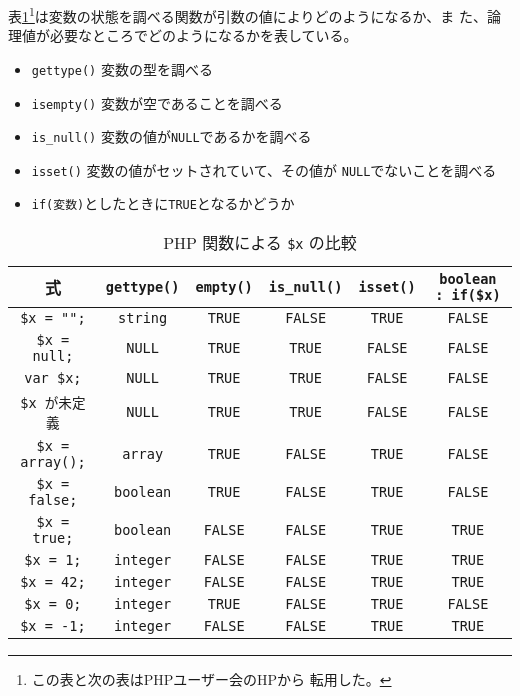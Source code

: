 表\ref{compareByFunction}\footnote{この表と次の表はPHPユーザー会のHPから
転用した。}は変数の状態を調べる関数が引数の値によりどのようになるか、ま
た、論理値が必要なところでどのようになるかを表している。
\begin{itemize}
 \item \texttt{gettype()} 変数の型を調べる
 \item \texttt{isempty()} 変数が空であることを調べる
 \item \texttt{is\_null()} 変数の値が\texttt{NULL}であるかを調べる
 \item \texttt{isset()} 変数の値がセットされていて、その値が
       \texttt{NULL}でないことを調べる
 \item \texttt{if(変数)}としたときに\texttt{TRUE}となるかどうか
\end{itemize}
\begin{table}[ht]
\caption{PHP 関数による \protect\texttt{\$x} の比較}\label{compareByFunction}
\begin{center}
  \begin{tabular}{|*{6}{c|}}\hline
式&\verb+gettype()+&\verb+empty()+&\verb+is_null()+&\verb+isset()+&\verb+boolean : if($x)+\\\hline
\verb+$x = "";+&\verb+string+&\verb+TRUE+&\verb+FALSE+&\verb+TRUE+&\verb+FALSE+\\\hline
\verb+$x = null;+&\verb+NULL+&\verb+TRUE+&\verb+TRUE+&\verb+FALSE+&\verb+FALSE+\\\hline
\verb+var $x;+&\verb+NULL+&\verb+TRUE+&\verb+TRUE+&\verb+FALSE+&\verb+FALSE+\\\hline
\verb+$x が未定義+&\verb+NULL+&\verb+TRUE+&\verb+TRUE+&\verb+FALSE+&\verb+FALSE+\\\hline
\verb+$x = array();+&\verb+array+&\verb+TRUE+&\verb+FALSE+&\verb+TRUE+&\verb+FALSE+\\\hline
\verb+$x = false;+&\verb+boolean+&\verb+TRUE+&\verb+FALSE+&\verb+TRUE+&\verb+FALSE+\\\hline
\verb+$x = true;+&\verb+boolean+&\verb+FALSE+&\verb+FALSE+&\verb+TRUE+&\verb+TRUE+\\\hline
\verb+$x = 1;+&\verb+integer+&\verb+FALSE+&\verb+FALSE+&\verb+TRUE+&\verb+TRUE+\\\hline
\verb+$x = 42;+&\verb+integer+&\verb+FALSE+&\verb+FALSE+&\verb+TRUE+&\verb+TRUE+\\\hline
\verb+$x = 0;+&\verb+integer+&\verb+TRUE+&\verb+FALSE+&\verb+TRUE+&\verb+FALSE+\\\hline
\verb+$x = -1;+&\verb+integer+&\verb+FALSE+&\verb+FALSE+&\verb+TRUE+&\verb+TRUE+\\\hline

\end{tabular}
\end{center}
\end{table}
